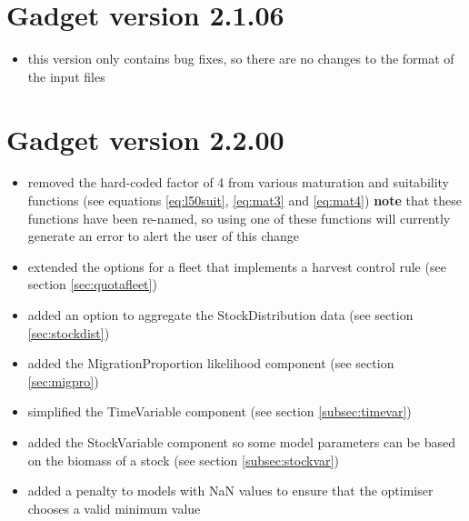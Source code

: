 \documentclass[]{book}
\providecommand{\tightlist}{%
  \setlength{\itemsep}{0pt}\setlength{\parskip}{0pt}}
\begin{document}
\hypertarget{sec:v2106}{%
\section{Gadget version 2.1.06}\label{sec:v2106}}

\begin{itemize}
\tightlist
\item
  this version only contains bug fixes, so there are no changes to the
  format of the input files
\end{itemize}

\hypertarget{sec:v2200}{%
\section{Gadget version 2.2.00}\label{sec:v2200}}

\begin{itemize}
\item
  removed the hard-coded factor of 4 from various maturation and
  suitability functions (see equations
  \eqref{eq:l50suit},
  \eqref{eq:mat3}
  and \eqref{eq:mat4}) \textbf{note} that these functions have been
  re-named, so using one of these functions will currently generate an
  error to alert the user of this change
\item
  extended the options for a fleet that implements a harvest control
  rule (see section \ref{sec:quotafleet})
\item
  added an option to aggregate the StockDistribution data (see
  section \ref{sec:stockdist})
\item
  added the MigrationProportion likelihood component (see
  section \ref{sec:migpro})
\item
  simplified the TimeVariable component (see
  section \ref{subsec:timevar})
\item
  added the StockVariable component so some model parameters can be
  based on the biomass of a stock (see
  section \ref{subsec:stockvar})
\item
  added a penalty to models with NaN values to ensure that the
  optimiser chooses a valid minimum value
\end{itemize}
\end{document}
